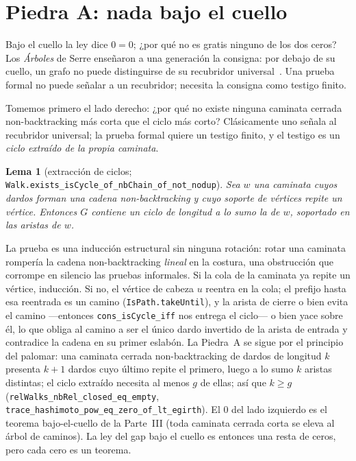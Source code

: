 \documentclass[11pt]{article}
\newtheorem{lemma}{Lema}
\newcommand{\lean}[1]{\texttt{#1}}
\begin{document}
\section{Piedra A: nada bajo el cuello}
\label{sec:stoneA}

Bajo el cuello la ley dice $0 = 0$; ¿por qué no es gratis ninguno de los dos ceros? Los
\emph{Árboles} de Serre enseñaron a una generación la consigna: por debajo de su cuello, un
grafo no puede distinguirse de su recubridor universal~\cite{Serre1980}. Una prueba formal
no puede señalar a un recubridor; necesita la consigna como testigo finito.

Tomemos primero el lado derecho: ¿por qué no existe ninguna caminata cerrada non-backtracking
más corta que el ciclo más corto? Clásicamente uno señala al recubridor universal; la prueba formal quiere un
testigo finito, y el testigo es un \emph{ciclo extraído de la propia caminata}.

\begin{lemma}[extracción de ciclos; \lean{Walk.exists\_isCycle\_of\_nbChain\_of\_not\_nodup}]
\label{lem:crux}
Sea $w$ una caminata cuyos dardos forman una cadena non-backtracking y cuyo soporte de
vértices repite un vértice. Entonces $G$ contiene un ciclo de longitud a lo sumo la de $w$,
soportado en las aristas de $w$.
\end{lemma}

La prueba es una inducción estructural sin ninguna rotación: rotar una caminata rompería la
cadena non-backtracking \emph{lineal} en la costura, una obstrucción que corrompe en
silencio las pruebas informales. Si la cola de la caminata ya repite un vértice, inducción.
Si no, el vértice de cabeza $u$ reentra en la cola; el prefijo hasta esa reentrada es un
camino (\lean{IsPath.takeUntil}), y la arista de cierre o bien evita el camino ---entonces
\lean{cons\_isCycle\_iff} nos entrega el ciclo--- o bien yace sobre él, lo que obliga al
camino a ser el único dardo invertido de la arista de entrada y contradice la cadena en su
primer eslabón. La Piedra~A se sigue por el principio del palomar: una caminata cerrada non-backtracking de
dardos de longitud $k$ presenta $k+1$ dardos cuyo último repite el primero, luego a lo sumo
$k$ aristas distintas; el ciclo extraído necesita al menos $g$ de ellas; así que $k \ge g$
(\lean{relWalks\_nbRel\_closed\_eq\_empty},
\lean{trace\_hashimoto\_pow\_eq\_zero\_of\_lt\_egirth}). El $0$ del lado izquierdo es el
teorema bajo-el-cuello de la Parte~III (toda caminata cerrada corta se eleva al árbol de
caminos). La ley del gap bajo el cuello es entonces una resta de ceros, pero cada cero es un
teorema.
\end{document}
